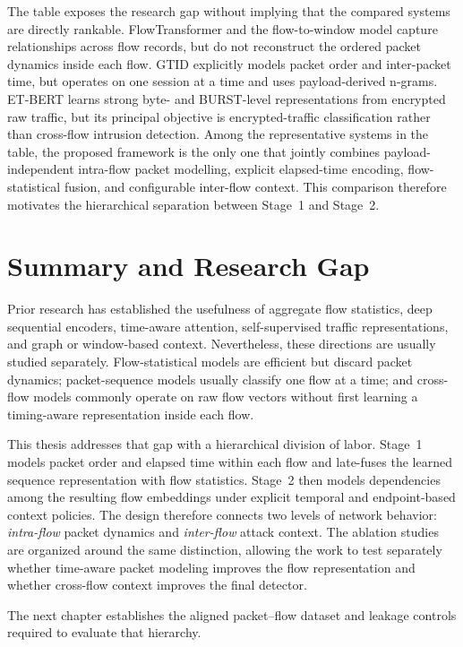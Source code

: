 \documentclass[11pt,fleqn]{report}
\begin{document}
The table exposes the research gap without implying that the compared systems
are directly rankable. FlowTransformer and the flow-to-window model capture
relationships across flow records, but do not reconstruct the ordered packet
dynamics inside each flow. GTID explicitly models packet order and inter-packet
time, but operates on one session at a time and uses payload-derived n-grams.
ET-BERT learns strong byte- and BURST-level representations from encrypted raw
traffic, but its principal objective is encrypted-traffic classification rather
than cross-flow intrusion detection. Among the representative systems in the
table, the proposed framework is the only one that jointly combines
payload-independent intra-flow packet modelling, explicit elapsed-time
encoding, flow-statistical fusion, and configurable inter-flow context. This
comparison therefore motivates the hierarchical separation between Stage~1 and
Stage~2.
\section{Summary and Research Gap}
\label{subsec:rw_gap}

Prior research has established the usefulness of aggregate flow statistics,
deep sequential encoders, time-aware attention, self-supervised traffic
representations, and graph or window-based context. Nevertheless, these
directions are usually studied separately. Flow-statistical models are
efficient but discard packet dynamics; packet-sequence models usually classify
one flow at a time; and cross-flow models commonly operate on raw flow vectors
without first learning a timing-aware representation inside each flow.

This thesis addresses that gap with a hierarchical division of labor. Stage~1
models packet order and elapsed time within each flow and late-fuses the learned
sequence representation with flow statistics. Stage~2 then models dependencies
among the resulting flow embeddings under explicit temporal and endpoint-based
context policies. The design therefore connects two levels of network behavior:
\emph{intra-flow} packet dynamics and \emph{inter-flow} attack context. The
ablation studies are organized around the same distinction, allowing the work
to test separately whether time-aware packet modeling improves the flow
representation and whether cross-flow context improves the final detector.

The next chapter establishes the aligned packet--flow dataset and leakage
controls required to evaluate that hierarchy.
\end{document}
